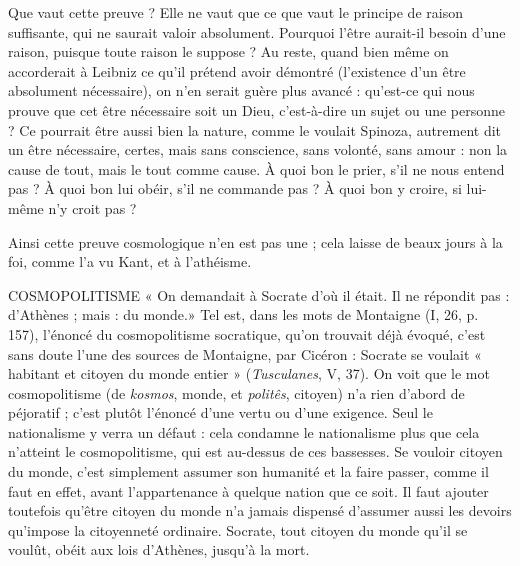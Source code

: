 Que vaut cette preuve ? Elle ne vaut que ce que vaut le principe de raison
suffisante, qui ne saurait valoir absolument. Pourquoi l’être aurait-il besoin
d’une raison, puisque toute raison le suppose ? Au reste, quand bien même on
accorderait à Leibniz ce qu’il prétend avoir démontré (l’existence d’un être
absolument nécessaire), on n’en serait guère plus avancé : qu’est-ce qui nous
prouve que cet être nécessaire soit un Dieu, c’est-à-dire un sujet ou une
personne ? Ce pourrait être aussi bien la nature, comme le voulait Spinoza,
autrement dit un être nécessaire, certes, mais sans conscience, sans volonté, sans
amour : non la cause de tout, mais le tout comme cause. À quoi bon le prier,
s’il ne nous entend pas ? À quoi bon lui obéir, s’il ne commande pas ? À quoi
bon y croire, si lui-même n’y croit pas ?

Ainsi cette preuve cosmologique n’en est pas une ; cela laisse de beaux jours
à la foi, comme l’a vu Kant, et à l’athéisme.

COSMOPOLITISME  « On demandait à Socrate d’où il était. Il ne répondit
pas : d'Athènes ; mais : du monde.» Tel est,
dans les mots de Montaigne (I, 26, p. 157), l'énoncé du cosmopolitisme socratique,
qu’on trouvait déjà évoqué, c’est sans doute l’une des sources de Montaigne,
par Cicéron : Socrate se voulait « habitant et citoyen du monde entier »
({\it Tusculanes}, V, 37). On voit que le mot cosmopolitisme (de {\it kosmos}, monde, et
{\it politês}, citoyen) n’a rien d’abord de péjoratif ; c’est plutôt l’énoncé d’une vertu
ou d’une exigence. Seul le nationalisme y verra un défaut : cela condamne le
nationalisme plus que cela n’atteint le cosmopolitisme, qui est au-dessus de ces
bassesses. Se vouloir citoyen du monde, c’est simplement assumer son humanité
et la faire passer, comme il faut en effet, avant l’appartenance à quelque
nation que ce soit. Il faut ajouter toutefois qu'être citoyen du monde n’a jamais
dispensé d’assumer aussi les devoirs qu’impose la citoyenneté ordinaire.
Socrate, tout citoyen du monde qu’il se voulût, obéit aux lois d'Athènes,
jusqu’à la mort.

